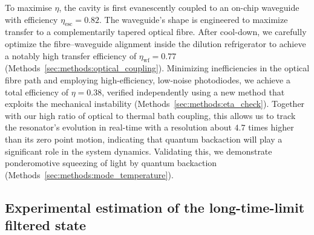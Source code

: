 \documentclass[aps,prx,twocolumn,amsmath,amssymb,superscriptaddress,floatfix,longbibliography
]{revtex4-2}
\begin{document}
To maximise $\eta$, the cavity is first evanescently coupled 
to an on-chip waveguide with efficiency $\eta_\text{esc} = 0.82$. The waveguide's shape is engineered to maximize transfer to a
complementarily tapered optical fibre. 
After cool-down, we carefully optimize the fibre–waveguide alignment inside the dilution refrigerator to achieve a notably high transfer efficiency of $\eta_\text{wf} = 0.77$ (Methods~\ref{sec:methods:optical_coupling}).
Minimizing inefficiencies in the optical fibre path and employing high-efficiency, low-noise photodiodes, we achieve a total efficiency of $\eta = 0.38$, verified independently using a new method that exploits the mechanical instability (Methods~\ref{sec:methods:eta_check}). 
Together with our high ratio of optical to thermal bath coupling, this allows us to track the resonator's evolution in real-time with a resolution about $4.7$ times higher than its zero point motion, indicating that quantum backaction will play a significant role in the system dynamics. 
Validating this, we demonstrate ponderomotive squeezing of light by quantum backaction~\cite{bowen2015quantum} (Methods~\ref{sec:methods:mode_temperature}).

\subsection*{Experimental estimation of the long-time-limit filtered state}
\end{document}
